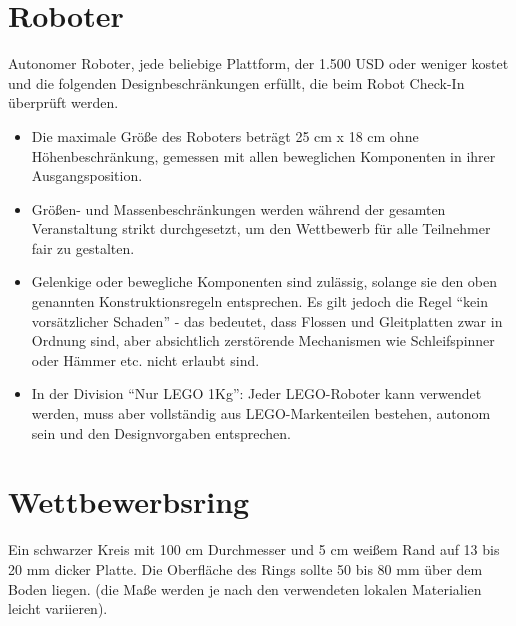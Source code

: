 \documentclass[a4paper,12pt]{article}
\begin{document}
\section{Roboter}
Autonomer Roboter, jede beliebige Plattform, der 1.500 USD oder weniger kostet und die folgenden Designbeschränkungen erfüllt, die beim Robot Check-In überprüft werden.
\begin{itemize}
	\item Die maximale Größe des Roboters beträgt 25 cm x 18 cm ohne Höhenbeschränkung, gemessen mit allen beweglichen Komponenten in ihrer Ausgangsposition.
	\item Größen- und Massenbeschränkungen werden während der gesamten Veranstaltung strikt durchgesetzt, um den Wettbewerb für alle Teilnehmer fair zu gestalten.
	\item Gelenkige oder bewegliche Komponenten sind zulässig, solange sie den oben genannten Konstruktionsregeln entsprechen. Es gilt jedoch die Regel "`kein vorsätzlicher Schaden"' - das bedeutet, dass Flossen und Gleitplatten zwar in Ordnung sind, aber absichtlich zerstörende Mechanismen wie Schleifspinner oder Hämmer etc. nicht erlaubt sind.
	\item In der Division "`Nur LEGO 1Kg"': Jeder LEGO-Roboter kann verwendet werden, muss aber vollständig aus LEGO-Markenteilen bestehen, autonom sein und den Designvorgaben entsprechen.
\end{itemize}

\section{Wettbewerbsring}
Ein schwarzer Kreis mit 100 cm Durchmesser und 5 cm weißem Rand auf 13 bis 20 mm dicker Platte. Die Oberfläche des Rings sollte 50 bis 80 mm über dem Boden liegen. (die Maße werden je nach den verwendeten lokalen Materialien leicht variieren).
\end{document}

